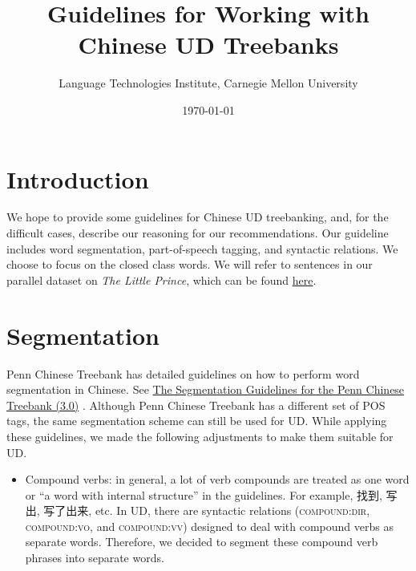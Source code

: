 \documentclass[UTF8,oneside]{book}
\begin{document}
\title{\textbf{Guidelines for Working with Chinese UD Treebanks}}
\author{Language Technologies Institute, Carnegie Mellon University}
\date{\today}
\maketitle

\tableofcontents

\chapter{Introduction}
We hope to provide some guidelines for Chinese UD treebanking, and, for the difficult cases, describe our reasoning for our recommendations. Our guideline includes word segmentation, part-of-speech tagging, and syntactic relations. We choose to focus on the closed class words. We will refer to sentences in our parallel dataset on \textit{The Little Prince}, which can be found \href{https://github.com/Aklaran/11722-grammar-formalisms-s20-little-prince/}{here}. 

\chapter{Segmentation}
Penn Chinese Treebank has detailed guidelines on how to perform word segmentation in Chinese. 
See \href{https://repository.upenn.edu/cgi/viewcontent.cgi?article=1038&context=ircs_reports}{The Segmentation Guidelines for the Penn Chinese
Treebank (3.0)} \cite{segmentation}. 
Although Penn Chinese Treebank has a different set of POS tags, the same segmentation scheme can still be used for UD. While applying these guidelines, we made the following adjustments to make them suitable for UD.
\begin{itemize}
\item Compound verbs: in general, a lot of verb compounds are treated as one word or ``a word with internal structure'' in the guidelines. For example, 找到, 写出, 写了出来, etc. In UD, there are syntactic relations (\textsc{compound:dir}, \textsc{compound:vo}, and \textsc{compound:vv}) designed to deal with compound verbs as separate words. Therefore, we decided to segment these compound verb phrases into separate words. 
\end{itemize}
\end{document}
